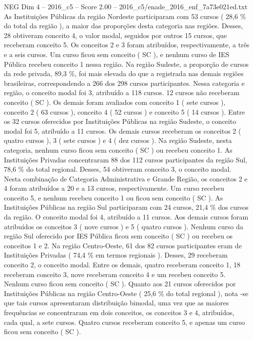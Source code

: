 \begin{textsample}{NEG Dim 4 – 2016\_c5 – Score 2.00 – 2016\_c5/enade\_2016\_enf\_7a73e021ed.txt}
As Instituições Públicas da região Nordeste participaram com 53 cursos ( 28,6 \% do total da região ), a maior das proporções desta categoria nas regiões.
Desses, 28 obtiveram conceito 4, o valor modal, seguidos por outros 15 cursos, que receberam conceito 5.
Os conceitos 2 e 3 foram atribuídos, respectivamente, a três e a seis cursos.
Um curso ficou sem conceito ( SC ), e nenhum curso de IES Pública recebeu conceito 1 nessa região.
Na região Sudeste, a proporção de cursos da rede privada, 89,3 \%, foi mais elevada do que a registrada nas demais regiões brasileiras, correspondendo a 266 dos 298 cursos participantes.
Nessa categoria e região, o conceito modal foi 3, atribuído a 118 cursos. 12 cursos não receberam conceito ( SC ).
Os demais foram avaliados com conceito 1 ( sete cursos ), conceito 2 ( 63 cursos ), conceito 4 ( 52 cursos ) e conceito 5 ( 14 cursos ).
Entre os 32 cursos oferecidos por Instituições Públicas na região Sudeste, o conceito modal foi 5, atribuído a 11 cursos.
Os demais cursos receberam os conceitos 2 ( quatro cursos ), 3 ( sete cursos ) e 4 ( dez cursos ).
Na região Sudeste, nesta categoria, nenhum curso ficou sem conceito ( SC ) ou recebeu conceito 1.
As Instituições Privadas concentraram 88 dos 112 cursos participantes da região Sul, 78,6 \% do total regional.
Desses, 54 obtiveram conceito 3, o conceito modal.
Nesta combinação de Categoria Administrativa e Grande Região, os conceitos 2 e 4 foram atribuídos a 20 e a 13 cursos, respectivamente.
Um curso recebeu conceito 5, e nenhum recebeu conceito 1 ou ficou sem conceito ( SC ).
As Instituições Públicas na região Sul participaram com 24 cursos, 21,4 \% dos cursos da região.
O conceito modal foi 4, atribuído a 11 cursos.
Aos demais cursos foram atribuídos os conceitos 3 ( nove cursos ) e 5 ( quatro cursos ).
Nenhum curso da região Sul oferecido por IES Pública ficou sem conceito ( SC ) ou recebeu os conceitos 1 e 2.
Na região Centro-Oeste, 61 dos 82 cursos participantes eram de Instituições Privadas ( 74,4 \% em termos regionais ).
Desses, 29 receberam conceito 2, o conceito modal.
Entre os demais, quatro receberam conceito 1, 18 receberam conceito 3, nove receberam conceito 4 e um recebeu conceito 5.
Nenhum curso ficou sem conceito ( SC ).
Quanto aos 21 cursos oferecidos por Instituições Públicas na região Centro-Oeste ( 25,6 \% do total regional ), nota -se que tais cursos apresentaram distribuição bimodal, uma vez que as maiores frequências se concentraram em dois conceitos, os conceitos 3 e 4, atribuídos, cada qual, a sete cursos.
Quatro cursos receberam conceito 5, e apenas um curso ficou sem conceito ( SC ).

\end{textsample}
